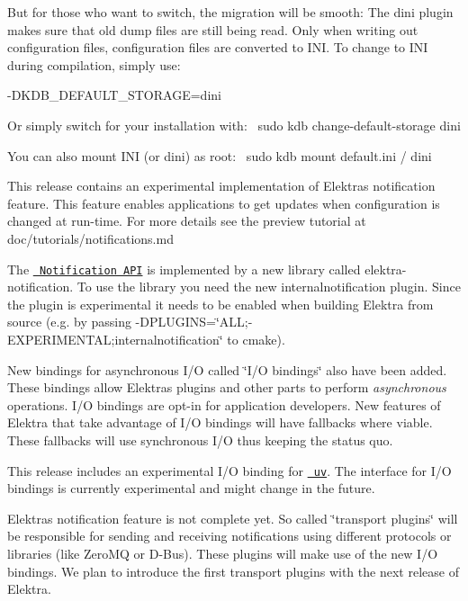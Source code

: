 But for those who want to switch, the migration will be smooth\+: The {\ttfamily dini} plugin makes sure that old dump files are still being read. Only when writing out configuration files, configuration files are converted to I\+NI. To change to I\+NI during compilation, simply use\+:

{\ttfamily -\/D\+K\+D\+B\+\_\+\+D\+E\+F\+A\+U\+L\+T\+\_\+\+S\+T\+O\+R\+A\+GE=dini}

Or simply switch for your installation with\+:~\newline
 {\ttfamily sudo kdb change-\/default-\/storage dini}

You can also mount I\+NI (or dini) as root\+:~\newline
 {\ttfamily sudo kdb mount default.\+ini / dini}

This release contains an experimental implementation of Elektra\textquotesingle{}s notification feature. This feature enables applications to get updates when configuration is changed at run-\/time. For more details see the preview tutorial at doc/tutorials/notifications.md

The \href{https://doc.libelektra.org/api/current/html/kdbnotification_8h.html}{\texttt{ Notification A\+PI}} is implemented by a new library called {\ttfamily elektra-\/notification}. To use the library you need the new internalnotification plugin. Since the plugin is experimental it needs to be enabled when building Elektra from source (e.\+g. by passing {\ttfamily -\/D\+P\+L\+U\+G\+I\+NS=\char`\"{}\+A\+L\+L;-\/\+E\+X\+P\+E\+R\+I\+M\+E\+N\+T\+A\+L;internalnotification\char`\"{}} to {\ttfamily cmake}).

New bindings for asynchronous I/O called \char`\"{}\+I/\+O bindings\char`\"{} also have been added. These bindings allow Elektra\textquotesingle{}s plugins and other parts to perform {\itshape asynchronous} operations. I/O bindings are opt-\/in for application developers. New features of Elektra that take advantage of I/O bindings will have fallbacks where viable. These fallbacks will use synchronous I/O thus keeping the status quo.

This release includes an experimental I/O binding for \href{http://libuv.org/}{\texttt{ uv}}. The interface for I/O bindings is currently experimental and might change in the future.

Elektra\textquotesingle{}s notification feature is not complete yet. So called \char`\"{}transport plugins\char`\"{} will be responsible for sending and receiving notifications using different protocols or libraries (like Zero\+MQ or D-\/\+Bus). These plugins will make use of the new I/O bindings. We plan to introduce the first transport plugins with the next release of Elektra.


